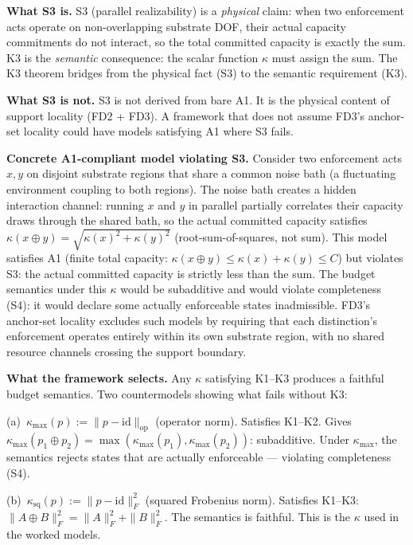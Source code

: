 \documentclass[11pt,a4paper]{article}
\theoremstyle{definition}
\newcommand{\op}{\mathrm{op}}
\begin{document}
\begin{tcolorbox}[apfbox, title={Status of S3 and Models That Violate It}]
\textbf{What S3 is.}  S3 (parallel realizability) is a \emph{physical} claim: when two enforcement acts operate on non-overlapping substrate DOF, their actual capacity commitments do not interact, so the total committed capacity is exactly the sum.  K3 is the \emph{semantic} consequence: the scalar function $\kappa$ must assign the sum.  The K3 theorem bridges from the physical fact (S3) to the semantic requirement (K3).

\smallskip\noindent\textbf{What S3 is not.}  S3 is not derived from bare A1.  It is the physical content of support locality (FD2 + FD3).  A framework that does not assume FD3's anchor-set locality could have models satisfying A1 where S3 fails.

\smallskip\noindent\textbf{Concrete A1-compliant model violating S3.}  Consider two enforcement acts $x, y$ on disjoint substrate regions that share a common noise bath (a fluctuating environment coupling to both regions).  The noise bath creates a hidden interaction channel: running $x$ and $y$ in parallel partially correlates their capacity draws through the shared bath, so the actual committed capacity satisfies $\kappa(x \oplus y) = \sqrt{\kappa(x)^2 + \kappa(y)^2}$ (root-sum-of-squares, not sum).  This model satisfies A1 (finite total capacity: $\kappa(x \oplus y) \le \kappa(x) + \kappa(y) \le C$) but violates S3: the actual committed capacity is strictly less than the sum.  The budget semantics under this $\kappa$ would be subadditive and would violate completeness (S4): it would declare some actually enforceable states inadmissible.  FD3's anchor-set locality excludes such models by requiring that each distinction's enforcement operates entirely within its own substrate region, with no shared resource channels crossing the support boundary.

\smallskip\noindent\textbf{What the framework selects.}  Any $\kappa$ satisfying K1--K3 produces a faithful budget semantics.  Two countermodels showing what fails without K3:

\smallskip\noindent(a)~$\kappa_{\max}(p) := \|p - \mathrm{id}\|_{\op}$ (operator norm).  Satisfies K1--K2.  Gives $\kappa_{\max}(p_1 \oplus p_2) = \max(\kappa_{\max}(p_1), \kappa_{\max}(p_2))$: subadditive.  Under $\kappa_{\max}$, the semantics rejects states that are actually enforceable --- violating completeness (S4).

\smallskip\noindent(b)~$\kappa_{\mathrm{sq}}(p) := \|p - \mathrm{id}\|_F^2$ (squared Frobenius norm).  Satisfies K1--K3: $\|A \oplus B\|_F^2 = \|A\|_F^2 + \|B\|_F^2$.  The semantics is faithful.  This is the $\kappa$ used in the worked models.
\end{tcolorbox}
\end{document}
